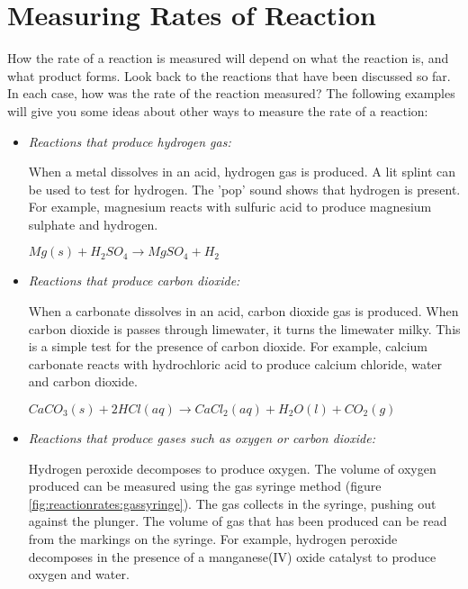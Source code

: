 



\section{Measuring Rates of Reaction}
\label{sec:reactionrates:measuring}

How the rate of a reaction is measured will depend on what the reaction is, and what product forms. Look back to the reactions that have been discussed so far. In each case, how was the rate of the reaction measured? The following examples will give you some ideas about other ways to measure the rate of a reaction:

\begin{itemize}
\item{\textit{Reactions that produce hydrogen gas:} 

When a metal dissolves in an acid, hydrogen gas is produced. A lit splint can be used to test for hydrogen. The 'pop' sound shows that hydrogen is present. For example, magnesium reacts with sulfuric acid to produce magnesium sulphate and hydrogen.
}
\begin{center}
\rm${Mg(s) + H_{2}SO_{4} \rightarrow MgSO_{4} + H_{2}}$
\end{center}
 
\item{\textit{Reactions that produce carbon dioxide:} 

When a carbonate dissolves in an acid, carbon dioxide gas is produced. When carbon dioxide is passes through limewater, it turns the limewater milky. This is a simple test for the presence of carbon dioxide. For example, calcium carbonate reacts with hydrochloric acid to produce calcium chloride, water and carbon dioxide.
}
\begin{center}
\rm${CaCO_{3}(s) + 2HCl(aq) \rightarrow CaCl_{2}(aq) + H_{2}O(l) + CO_{2}(g)}$
\end{center}

\item{\textit{Reactions that produce gases such as oxygen or carbon dioxide:} 

Hydrogen peroxide decomposes to produce oxygen. The volume of oxygen produced can be measured using the gas syringe method (figure \ref {fig:reactionrates:gassyringe}). The gas collects in the syringe, pushing out against the plunger. The volume of gas that has been produced can be read from the markings on the syringe. For example, hydrogen peroxide decomposes in the presence of a manganese(IV) oxide catalyst to produce oxygen and water.
}


\end{itemize}
